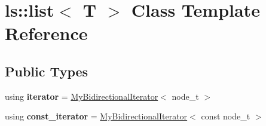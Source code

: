 \hypertarget{classls_1_1list}{}\section{ls\+:\+:list$<$ T $>$ Class Template Reference}
\label{classls_1_1list}
\subsection*{Public Types}
\begin{DoxyCompactItemize}
\item 
using {\bfseries iterator} = \hyperlink{classls_1_1MyBidirectionalIterator}{My\+Bidirectional\+Iterator}$<$ node\+\_\+t $>$\hypertarget{classls_1_1list_ae4aff2852ad6f2238e8b31d11ab0f574}{}\label{classls_1_1list_ae4aff2852ad6f2238e8b31d11ab0f574}

\item 
using {\bfseries const\+\_\+iterator} = \hyperlink{classls_1_1MyBidirectionalIterator}{My\+Bidirectional\+Iterator}$<$ const node\+\_\+t $>$\hypertarget{classls_1_1list_a46ba9d85a9148970316c2d57e6c21927}{}\label{classls_1_1list_a46ba9d85a9148970316c2d57e6c21927}

\end{DoxyCompactItemize}
